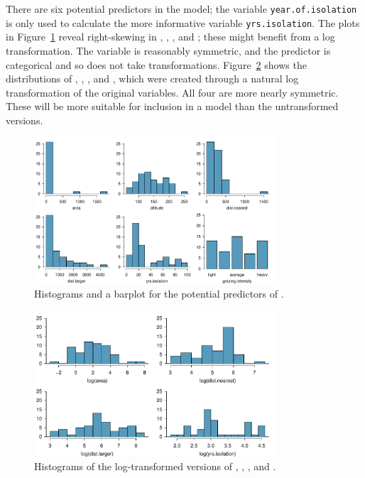 There are six potential predictors in the model; the variable \texttt{year.of.isolation} is only used to calculate the more informative variable \texttt{yrs.isolation}. The plots in Figure~\ref{forestbirdsPredictorDist} reveal right-skewing in , , , and ; these might benefit from a log transformation. The variable  is reasonably symmetric, and the predictor  is categorical and so does not take transformations. Figure~\ref{forestbirdsLogPredictorDist} shows the distributions of , , , and , which were created through a natural log transformation of the original variables. All four are more nearly symmetric. These will be more suitable for inclusion in a model than the untransformed versions.

\begin{figure}[h!]
	\centering
	\includegraphics[width=0.8\textwidth]
	{ch_multiple_linear_regression_oi_biostat/figures/forestbirdsPredictorDist/forestbirdsPredictorDist.pdf}
    \caption{Histograms and a barplot for the potential predictors of .}
   	\label{forestbirdsPredictorDist}
\end{figure}

\begin{figure}[h!]
	\centering
	\includegraphics[width=0.8\textwidth]
	{ch_multiple_linear_regression_oi_biostat/figures/forestbirdsLogPredictorDist/forestbirdsLogPredictorDist.pdf}
    \caption{Histograms of the log-transformed versions of , , , and .}
   	\label{forestbirdsLogPredictorDist}
\end{figure}

